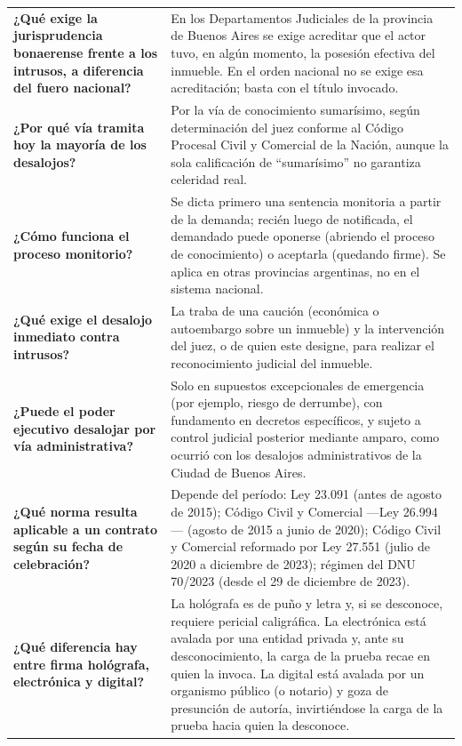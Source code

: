 \documentclass[12pt,oneside]{book}
\begin{document}
\begin{longtable}{
    >{\raggedright\arraybackslash}p{}
    >{\raggedright\arraybackslash}p{}
}
\textbf{¿Qué exige la jurisprudencia bonaerense frente a los intrusos, a diferencia del fuero nacional?} &
En los Departamentos Judiciales de la provincia de Buenos Aires se exige acreditar que el actor tuvo, en algún momento, la posesión efectiva del inmueble. En el orden nacional no se exige esa acreditación; basta con el título invocado. \\

\textbf{¿Por qué vía tramita hoy la mayoría de los desalojos?} &
Por la vía de conocimiento sumarísimo, según determinación del juez conforme al Código Procesal Civil y Comercial de la Nación, aunque la sola calificación de ``sumarísimo'' no garantiza celeridad real. \\

\textbf{¿Cómo funciona el proceso monitorio?} &
Se dicta primero una sentencia monitoria a partir de la demanda; recién luego de notificada, el demandado puede oponerse (abriendo el proceso de conocimiento) o aceptarla (quedando firme). Se aplica en otras provincias argentinas, no en el sistema nacional. \\

\textbf{¿Qué exige el desalojo inmediato contra intrusos?} &
La traba de una caución (económica o autoembargo sobre un inmueble) y la intervención del juez, o de quien este designe, para realizar el reconocimiento judicial del inmueble. \\

\textbf{¿Puede el poder ejecutivo desalojar por vía administrativa?} &
Solo en supuestos excepcionales de emergencia (por ejemplo, riesgo de derrumbe), con fundamento en decretos específicos, y sujeto a control judicial posterior mediante amparo, como ocurrió con los desalojos administrativos de la Ciudad de Buenos Aires. \\

\textbf{¿Qué norma resulta aplicable a un contrato según su fecha de celebración?} &
Depende del período: Ley 23.091 (antes de agosto de 2015); Código Civil y Comercial ---Ley 26.994--- (agosto de 2015 a junio de 2020); Código Civil y Comercial reformado por Ley 27.551 (julio de 2020 a diciembre de 2023); régimen del DNU 70/2023 (desde el 29 de diciembre de 2023). \\

\textbf{¿Qué diferencia hay entre firma hológrafa, electrónica y digital?} &
La hológrafa es de puño y letra y, si se desconoce, requiere pericial caligráfica. La electrónica está avalada por una entidad privada y, ante su desconocimiento, la carga de la prueba recae en quien la invoca. La digital está avalada por un organismo público (o notario) y goza de presunción de autoría, invirtiéndose la carga de la prueba hacia quien la desconoce. \\


\end{longtable}
\end{document}
